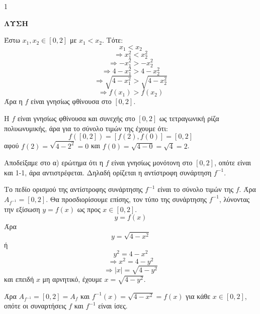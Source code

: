 \begin{ylh}{1}
    \item [Ύλη από εικόνα]
\end{ylh}
\textbf{ΛΥΣΗ}

\begin{alist}
    \item Έστω $x_1, x_2 \in [0,2]$ με $x_1 < x_2$. Τότε:
    \[
    x_1 < x_2
    \]
    \[
    \Rightarrow x_1^2 < x_2^2
    \]
    \[
    \Rightarrow -x_1^2 > -x_2^2
    \]
    \[
    \Rightarrow 4 - x_1^2 > 4 - x_2^2
    \]
    \[
    \Rightarrow \sqrt{4 - x_1^2} > \sqrt{4 - x_2^2}
    \]
    \[
    \Rightarrow f(x_1) > f(x_2)
    \]
    Άρα η $f$ είναι γνησίως φθίνουσα στο $[0,2]$.
    \item 
    \begin{rlist}
        \item Η $f$ είναι γνησίως φθίνουσα και συνεχής στο $[0,2]$ ως τετραγωνική ρίζα πολυωνυμικής, άρα για το σύνολο τιμών της έχουμε ότι:
        \[
        f([0,2]) = [f(2), f(0)] = [0,2]
        \]
        αφού $f(2) = \sqrt{4 - 2^2} = 0$ και $f(0) = \sqrt{4 - 0} = \sqrt{4} = 2$.
        \item Αποδείξαμε στο α) ερώτημα ότι η $f$ είναι γνησίως μονότονη στο $[0,2]$, οπότε είναι και 1-1, άρα αντιστρέφεται. Δηλαδή ορίζεται η αντίστροφη συνάρτηση $f^{-1}$.
        \item Το πεδίο ορισμού της αντίστροφης συνάρτησης $f^{-1}$ είναι το σύνολο τιμών της $f$.
        Άρα $A_{f^{-1}} = [0,2]$. Θα προσδιορίσουμε επίσης, τον τύπο της συνάρτησης $f^{-1}$, λύνοντας την εξίσωση $y = f(x)$ ως προς $x \in [0,2]$.
        \[
        y = f(x)
        \]
        Άρα
        \[
        y = \sqrt{4 - x^2}
        \]
        ή
        \[
        y^2 = 4 - x^2
        \]
        \[
        \Rightarrow x^2 = 4 - y^2
        \]
        \[
        \Rightarrow |x| = \sqrt{4 - y^2}
        \]
        και επειδή $x$ μη αρνητικό, έχουμε $x = \sqrt{4 - y^2}$.
        
        Άρα $A_{f^{-1}} = [0,2] = A_f$ και $f^{-1}(x) = \sqrt{4 - x^2} = f(x)$ για κάθε $x \in [0,2]$, οπότε οι συναρτήσεις $f$ και $f^{-1}$ είναι ίσες.
    \end{rlist}
\end{alist}